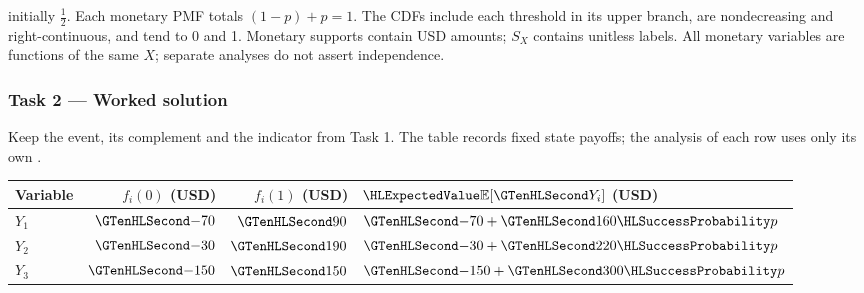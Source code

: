 initially $\frac{1}{2}$.
Each monetary PMF totals $(1-p)+p=1$. The CDFs include each threshold
in its upper branch, are nondecreasing and right-continuous, and tend to 0 and 1.
Monetary supports contain USD amounts; $S_X$ contains unitless labels.
All monetary variables are functions of the same $X$; separate analyses do not assert independence.
\clearpage\subsubsection*{Task 2 --- Worked solution}\label{sol:c3-agriculture-decision}
Keep the event, its complement and the indicator from Task 1.
The table records fixed state payoffs; the analysis of each row uses only its own .
\begin{center}\begin{tabular}{lrrl}\toprule
Variable & $f_i(0)$ (USD) & $f_i(1)$ (USD) & $\ExpectedValue{\mathbb E}[\Money{Y_i}]$ (USD)\\\midrule
$Y_1$ & $\Money{-70}$ & $\Money{90}$ & $\Money{-70}+\Money{160}\SuccessProb{p}$\\
$Y_2$ & $\Money{-30}$ & $\Money{190}$ & $\Money{-30}+\Money{220}\SuccessProb{p}$\\
$Y_3$ & $\Money{-150}$ & $\Money{150}$ & $\Money{-150}+\Money{300}\SuccessProb{p}$\\
\bottomrule\end{tabular}\end{center}
